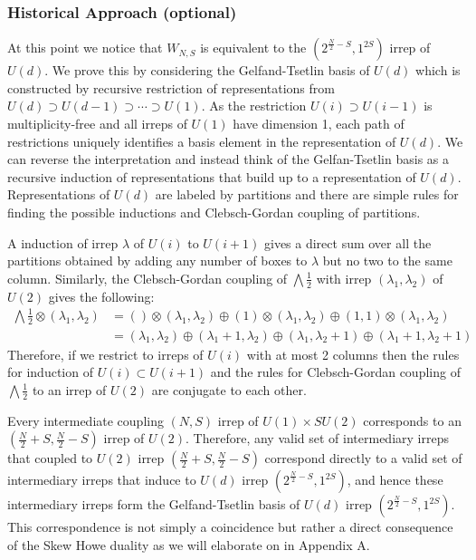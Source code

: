\documentclass{article}
\begin{document}
\subsubsection{Historical Approach (optional)}
At this point we notice that $W_{N,S}$ is equivalent to the $(2^{\frac{N}{2}-S},1^{2S})$ irrep of $U(d)$. We prove this by considering the Gelfand-Tsetlin basis of $U(d)$ which is constructed by recursive restriction of representations from $U(d) \supset U(d-1) \supset \cdots \supset U(1)$. As the restriction $U(i) \supset U(i-1)$ is multiplicity-free and all irreps of $U(1)$ have dimension 1, each path of restrictions uniquely identifies a basis element in the representation of $U(d)$. We can reverse the interpretation and instead think of the Gelfan-Tsetlin basis as a recursive induction of representations that build up to a representation of $U(d)$. Representations of $U(d)$ are labeled by partitions and there are simple rules for finding the possible inductions and Clebsch-Gordan coupling of partitions. 

A induction of irrep $\lambda$ of $U(i)$ to $U(i+1)$ gives a direct sum over all the partitions obtained by adding any number of boxes to $\lambda$ but no two to the same column. Similarly, the Clebsch-Gordan coupling of $\bigwedge\frac{1}{2}$ with irrep $(\lambda_1,\lambda_2)$ of $U(2)$ gives the following:
\begin{align}
    \bigwedge\frac{1}{2}\otimes (\lambda_1,\lambda_2) &= () \otimes (\lambda_1,\lambda_2) \oplus (1) \otimes (\lambda_1,\lambda_2)\oplus (1,1) \otimes (\lambda_1,\lambda_2)\\
    &= (\lambda_1,\lambda_2) \oplus (\lambda_1+1,\lambda_2)\oplus (\lambda_1,\lambda_2+1)\oplus (\lambda_1+1,\lambda_2+1)
\end{align}
Therefore, if we restrict to irreps of $U(i)$ with at most 2 columns then the rules for induction of $U(i) \subset U(i+1)$ and the rules for Clebsch-Gordan coupling of $\bigwedge\frac{1}{2}$ to an irrep of $U(2)$ are conjugate to each other.

Every intermediate coupling $(N,S)$ irrep of $U(1) \times SU(2)$ corresponds to an $(\frac{N}{2}+S,\frac{N}{2}-S)$ irrep of $U(2)$. Therefore, any valid set of intermediary irreps that coupled to $U(2)$ irrep $(\frac{N}{2}+S,\frac{N}{2}-S)$ correspond directly to a valid set of intermediary irreps that induce to $U(d)$ irrep $(2^{\frac{N}{2}-S},1^{2S})$, and hence these intermediary irreps form the Gelfand-Tsetlin basis of $U(d)$ irrep $(2^{\frac{N}{2}-S},1^{2S})$. This correspondence is not simply a coincidence but rather a direct consequence of the Skew Howe duality as we will elaborate on in Appendix A.
\end{document}
